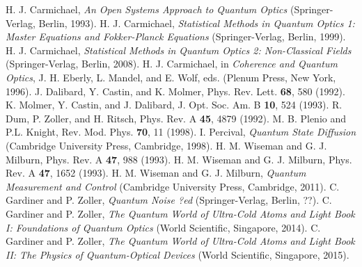 \documentclass[twocolumn,aps,eqsecnum,showkeys,amsmath]{revtex4}
\begin{document}


\begin{references} 
%
 H. J. Carmichael, \textit{An Open Systems Approach to 
	Quantum Optics} (Springer-Verlag, Berlin, 1993).
%
 H. J. Carmichael, \textit{Statistical Methods in Quantum 
Optics 1: Master Equations and Fokker-Planck Equations} (Springer-Verlag, 
Berlin, 1999). 
%
 H. J. Carmichael, \textit{Statistical Methods in Quantum 
Optics 2: Non-Classical Fields} (Springer-Verlag, Berlin, 2008). 
%
 H. J. Carmichael, in \textit{Coherence and Quantum  
Optics}, J. H. Eberly, L. Mandel, and E. Wolf, eds. (Plenum Press, 
New York, 1996).
%
 J. Dalibard, Y. Castin, and K. Molmer, Phys. Rev. 
Lett. \textbf{68}, 580 (1992).
%
 K. Molmer, Y. Castin, and J. Dalibard, J. Opt. Soc. 
Am. B \textbf{10}, 524 (1993). 
%
 R. Dum, P. Zoller, and H. Ritsch, Phys. Rev. A 
\textbf{45}, 4879 (1992).
%
 M. B. Plenio and P.L. Knight, Rev. Mod. Phys. 
\textbf{70}, 11 (1998).
%
 I. Percival, \textit{Quantum State Diffusion}  
(Cambridge University Press, Cambridge, 1998). 
%
 H. M. Wiseman and G. J. Milburn, Phys. Rev. A 
\textbf{47}, 988 (1993).
%
 H. M. Wiseman and G. J. Milburn, Phys. Rev. A 
\textbf{47}, 1652 (1993).
%
 H. M. Wiseman and G. J. Milburn, \textit{Quantum 
Measurement and Control} (Cambridge University Press, Cambridge, 
2011). 
%
 C. Gardiner and P. Zoller, \textit{Quantum 
Noise ?ed} (Springer-Verlag, Berlin, ??). 
%
 C. Gardiner and P. Zoller, \textit{The Quantum World of 
Ultra-Cold Atoms and Light Book I: Foundations of Quantum Optics} 
(World Scientific, Singapore, 2014). 
%
 C. Gardiner and P. Zoller, \textit{The Quantum World 
of Ultra-Cold Atoms and Light Book II: The Physics of Quantum-Optical 
Devices} (World Scientific, Singapore, 2015).  

\end{references}
\end{document}

